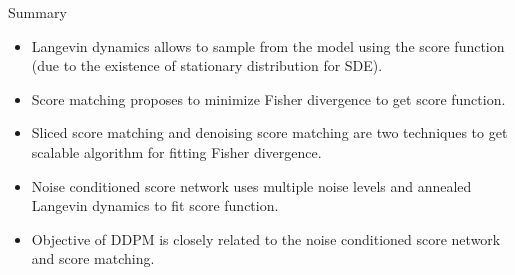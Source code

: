 \begin{frame}{Summary}
	\begin{itemize}
		\item Langevin dynamics allows to sample from the model using the score function (due to the existence of stationary distribution for SDE).
		\vfill
		\item Score matching proposes to minimize Fisher divergence to get score function.
		\vfill
		\item Sliced score matching and denoising score matching are two techniques to get scalable algorithm for fitting Fisher divergence.
		\vfill
		\item Noise conditioned score network uses multiple noise levels and annealed Langevin dynamics to fit score function.
		\vfill
		\item Objective of DDPM is closely related to the noise conditioned score network and score matching.	
	\end{itemize}
\end{frame}
 